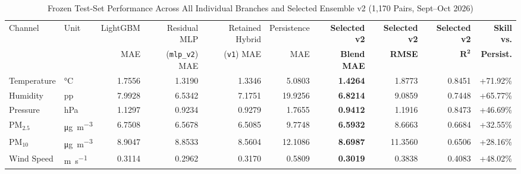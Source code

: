 \documentclass[journal,a4paper]{IEEEtran}
\begin{document}
\begin{table}[!t]
\caption{Frozen Test-Set Performance Across All Individual Branches and Selected Ensemble v2 (1{,}170 Pairs, Sept--Oct 2026)}
\label{tab:mae}
\centering
\footnotesize
\setlength{\tabcolsep}{5.5pt}
\begin{tabular}{@{}llrrrrrrrr@{}}
\toprule
Channel & Unit & LightGBM & Residual MLP & Retained Hybrid & Persistence & \textbf{Selected v2} & \textbf{Selected v2} & \textbf{Selected v2} & \textbf{Skill vs.} \\
        &      & MAE      & (\texttt{mlp\_v2}) MAE & (\texttt{v1}) MAE & MAE         & \textbf{Blend MAE}   & \textbf{RMSE}        & $\boldsymbol{R^2}$   & \textbf{Persist.} \\
\midrule
Temperature & \si{\celsius}                    & 1.7556 & 1.3190 & 1.3346 & 5.0803 & \textbf{1.4264} & 1.8773 & 0.8451 & +71.92\% \\
Humidity    & pp                               & 7.9928 & 6.5342 & 7.1751 & 19.9256 & \textbf{6.8214} & 9.0859 & 0.7448 & +65.77\% \\
Pressure    & \si{hPa}                         & 1.1297 & 0.9234 & 0.9279 & 1.7655 & \textbf{0.9412} & 1.1916 & 0.8473 & +46.69\% \\
PM$_{2.5}$  & \si{\micro\gram\per\cubic\metre} & 6.7508 & 6.5678 & 6.5085 & 9.7748 & \textbf{6.5932} & 8.6663 & 0.6684 & +32.55\% \\
PM$_{10}$   & \si{\micro\gram\per\cubic\metre} & 8.9047 & 8.8533 & 8.5604 & 12.1086 & \textbf{8.6987} & 11.3560 & 0.6506 & +28.16\% \\
Wind Speed  & \si{\metre\per\second}           & 0.3114 & 0.2962 & 0.3170 & 0.5809 & \textbf{0.3019} & 0.3838 & 0.4083 & +48.02\% \\
\bottomrule
\end{tabular}
\end{table}
\end{document}
